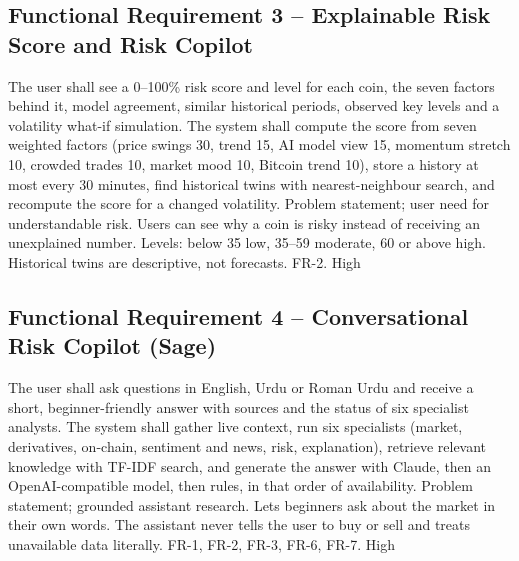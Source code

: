 \subsection{Functional Requirement 3 -- Explainable Risk Score and Risk Copilot}
{The user shall see a 0--100\% risk score and level for each coin, the seven factors behind it, model agreement, similar historical periods, observed key levels and a volatility what-if simulation.}
{The system shall compute the score from seven weighted factors (price swings 30, trend 15, AI model view 15, momentum stretch 10, crowded trades 10, market mood 10, Bitcoin trend 10), store a history at most every 30 minutes, find historical twins with nearest-neighbour search, and recompute the score for a changed volatility.}
{Problem statement; user need for understandable risk.}
{Users can see why a coin is risky instead of receiving an unexplained number.}
{Levels: below 35 low, 35--59 moderate, 60 or above high. Historical twins are descriptive, not forecasts.}
{FR-2.}
{High}

\subsection{Functional Requirement 4 -- Conversational Risk Copilot (Sage)}
{The user shall ask questions in English, Urdu or Roman Urdu and receive a short, beginner-friendly answer with sources and the status of six specialist analysts.}
{The system shall gather live context, run six specialists (market, derivatives, on-chain, sentiment and news, risk, explanation), retrieve relevant knowledge with TF-IDF search, and generate the answer with Claude, then an OpenAI-compatible model, then rules, in that order of availability.}
{Problem statement; grounded assistant research.}
{Lets beginners ask about the market in their own words.}
{The assistant never tells the user to buy or sell and treats unavailable data literally.}
{FR-1, FR-2, FR-3, FR-6, FR-7.}
{High}

